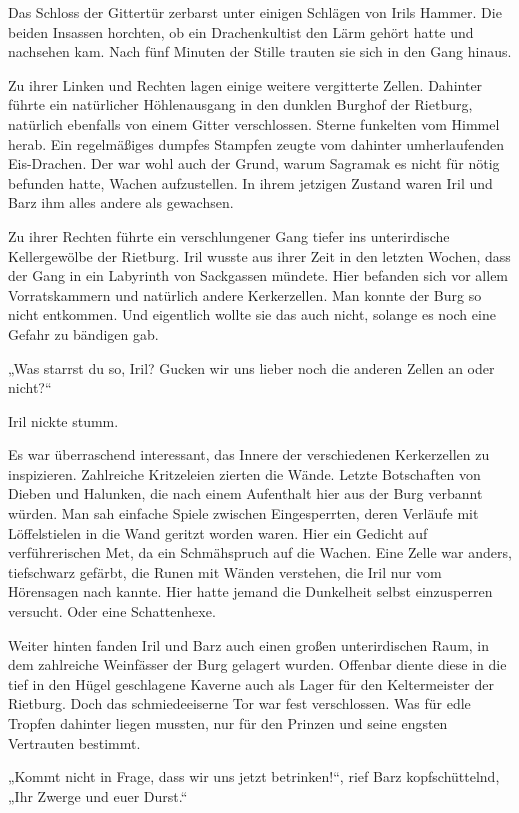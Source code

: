 Das Schloss der Gittertür zerbarst unter einigen Schlägen von Irils Hammer. Die beiden Insassen horchten, ob ein Drachenkultist den Lärm gehört hatte und nachsehen kam. Nach fünf Minuten der Stille trauten sie sich in den Gang hinaus.

Zu ihrer Linken und Rechten lagen einige weitere vergitterte Zellen. Dahinter führte ein natürlicher Höhlenausgang in den dunklen Burghof der Rietburg, natürlich ebenfalls von einem Gitter verschlossen. Sterne funkelten vom Himmel herab. Ein regelmäßiges dumpfes Stampfen zeugte vom dahinter umherlaufenden Eis-Drachen. Der war wohl auch der Grund, warum Sagramak es nicht für nötig befunden hatte, Wachen aufzustellen. In ihrem jetzigen Zustand waren Iril und Barz ihm alles andere als gewachsen.

Zu ihrer Rechten führte ein verschlungener Gang tiefer ins unterirdische Kellergewölbe der Rietburg. Iril wusste aus ihrer Zeit in den letzten Wochen, dass der Gang in ein Labyrinth von Sackgassen mündete. Hier befanden sich vor allem Vorratskammern und natürlich andere Kerkerzellen. Man konnte der Burg so nicht entkommen. Und eigentlich wollte sie das auch nicht, solange es noch eine Gefahr zu bändigen gab.

„Was starrst du so, Iril? Gucken wir uns lieber noch die anderen Zellen an oder nicht?“

Iril nickte stumm.

Es war überraschend interessant, das Innere der verschiedenen Kerkerzellen zu inspizieren. Zahlreiche Kritzeleien zierten die Wände. Letzte Botschaften von Dieben und Halunken, die nach einem Aufenthalt hier aus der Burg verbannt würden. Man sah einfache Spiele zwischen Eingesperrten, deren Verläufe mit Löffelstielen in die Wand geritzt worden waren. Hier ein Gedicht auf verführerischen Met, da ein Schmähspruch auf die Wachen. Eine Zelle war anders, tiefschwarz gefärbt, die Runen mit Wänden verstehen, die Iril nur vom Hörensagen nach kannte. Hier hatte jemand die Dunkelheit selbst einzusperren versucht. Oder eine Schattenhexe.

Weiter hinten fanden Iril und Barz auch einen großen unterirdischen Raum, in dem zahlreiche Weinfässer der Burg gelagert wurden. Offenbar diente diese in die tief in den Hügel geschlagene Kaverne auch als Lager für den Keltermeister der Rietburg. Doch das schmiedeeiserne Tor war fest verschlossen. Was für edle Tropfen dahinter liegen mussten, nur für den Prinzen und seine engsten Vertrauten bestimmt.

„Kommt nicht in Frage, dass wir uns jetzt betrinken!“, rief Barz kopfschüttelnd, „Ihr Zwerge und euer Durst.“

